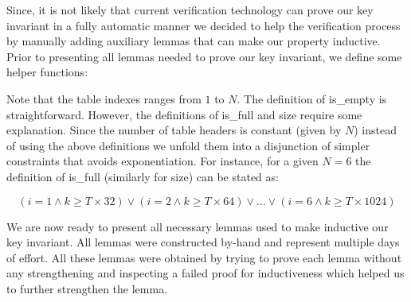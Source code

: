 Since, it is not likely that current verification technology can prove
our key invariant in a fully automatic manner we decided to help the
verification process by manually adding auxiliary lemmas that can make
our property inductive.
%
Prior to presenting all lemmas needed to prove our key
invariant, we define some helper functions:

\begin{minipage}{\linewidth}
\vspace{3mm}
\vspace{3mm}
\end{minipage}


\noindent Note that the table indexes ranges from $1$ to $N$. The
definition of \textsf{is\_empty} is straightforward. However, the
definitions of \textsf{is\_full} and \textsf{size} require some
explanation. Since the number of table headers is constant (given by
$N$) instead of using the above definitions we unfold them into a
disjunction of simpler constraints that avoids exponentiation. For
instance, for a given $N=6$ the definition of \textsf{is\_full}
(similarly for \textsf{size}) can be stated as:

\[ (i=1 \wedge k \geq T \times 32) \vee (i=2 \wedge k \geq T \times 64) \vee \ldots \vee (i=6 \wedge k \geq T \times 1024) \]

We are now ready to present all necessary lemmas used to make
inductive our key invariant. All lemmas were constructed by-hand and
represent multiple days of effort. All these lemmas were obtained by
trying to prove each lemma without any strengthening and inspecting a
failed proof for inductiveness which helped us to further strengthen
the lemma.

